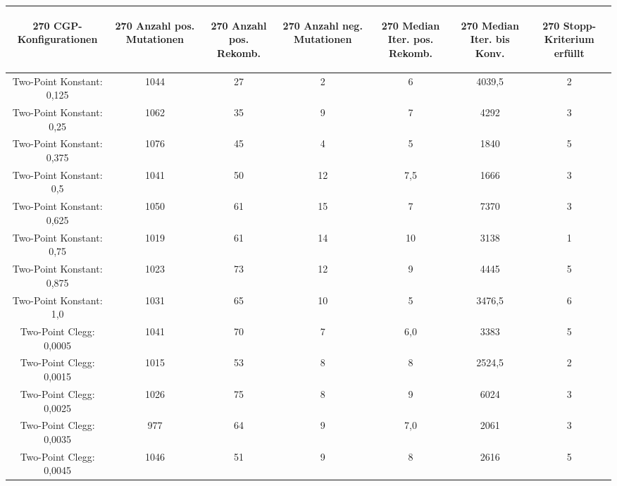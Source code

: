 \begin{table}[H]
	\centering
	\begin{tabular}{c | c | c | c | c | c | c}
		\begin{turn}{270} \textbf{CGP-Konfigurationen} \end{turn} & \begin{turn}{270} \textbf{Anzahl pos. Mutationen} \end{turn} & \begin{turn}{270} \textbf{Anzahl pos. Rekomb.} \end{turn} & \begin{turn}{270} \textbf{Anzahl neg. Mutationen} \end{turn} & \begin{turn}{270} \textbf{Median Iter. pos. Rekomb.} \end{turn} & \begin{turn}{270} \textbf{Median Iter. bis Konv.} \end{turn} & \begin{turn}{270} \textbf{Stopp-Kriterium erfüllt} \end{turn}\\
		\hline
		Two-Point Konstant: 0,125 & 1044 & 27 & 2 & 6 & 4039,5 & 2\\
		\hline
		Two-Point Konstant: 0,25 & 1062 & 35 & 9 & 7 & 4292 & 3\\
		\hline
		Two-Point Konstant: 0,375 & 1076 & 45 & 4 & 5 & 1840 & 5\\
		\hline
		Two-Point Konstant: 0,5 & 1041 & 50 & 12 & 7,5 & 1666 & 3\\
		\hline
		Two-Point Konstant: 0,625 & 1050 & 61 & 15 & 7 & 7370 & 3\\
		\hline
		Two-Point Konstant: 0,75 & 1019 & 61 & 14 & 10 & 3138 & 1\\
		\hline
		Two-Point Konstant: 0,875 & 1023 & 73 & 12 & 9 & 4445 & 5\\
		\hline
		Two-Point Konstant: 1,0 & 1031 & 65 & 10 & 5 & 3476,5 & 6\\
		\hline
		Two-Point Clegg: 0,0005 & 1041 & 70 & 7 & 6,0 & 3383 & 5\\
		\hline
		Two-Point Clegg: 0,0015 & 1015 & 53 & 8 & 8 & 2524,5 & 2\\
		\hline
		Two-Point Clegg: 0,0025 & 1026 & 75 & 8 & 9 & 6024 & 3\\
		\hline
		Two-Point Clegg: 0,0035 & 977 & 64 & 9 & 7,0 & 2061 & 3\\
		\hline
		Two-Point Clegg: 0,0045 & 1046 & 51 & 9 & 8 & 2616 & 5\\

\end{tabular}
\end{table}
